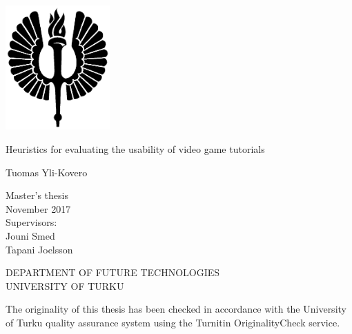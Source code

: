 \documentclass[12pt, a4paper]{report}
\begin{document}
\pagestyle{empty}
\begin{center}
	\includegraphics[width=4cm]{soihtu.png}
\end{center}
\vspace{3.0cm}
\begin{center}\large
Heuristics for evaluating the usability of video game tutorials
\end{center}


\vspace{0.5cm}
\begin{center}
	Tuomas Yli-Kovero
\end{center}

\vspace{0.5cm}
\begin{center}
	Master's thesis\\
	November 2017\\
	\bigbreak
	Supervisors:\\
	Jouni Smed\\
	Tapani Joelsson
\end{center}

\vspace{4.0cm}
\begin{center}
	DEPARTMENT OF FUTURE TECHNOLOGIES\\
	UNIVERSITY OF TURKU\\
\end{center}
 
\newpage
\null
\vfill
\noindent
The originality of this thesis has been checked in accordance with the University of Turku quality assurance system using the Turnitin OriginalityCheck service.

\clearpage
\end{document}
